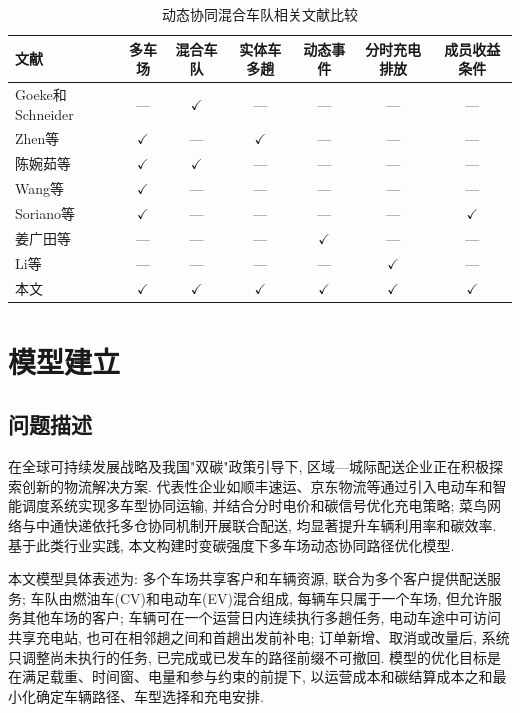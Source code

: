 \documentclass{setp-new}
\newcommand{\setptabsetup}{\fontsize{9pt}{10.5pt}\selectfont\renewcommand{\arraystretch}{0.90}\setlength{\tabcolsep}{2.2pt}\setlength{\aboverulesep}{0.4pt}\setlength{\belowrulesep}{0.4pt}\hbadness=10000}
\begin{document}
\begin{table}[H]
\centering
\caption{动态协同混合车队相关文献比较}
\label{tab:literature-comparison}
\setptabsetup
\begin{tabular*}{0.96\linewidth}{@{\extracolsep{\fill}}lcccccc@{}}
\toprule
文献 & 多车场 & 混合车队 & 实体车多趟 & 动态事件 & 分时充电排放 & 成员收益条件\\
\midrule
Goeke和Schneider\cite{ref:27} & --- & $\checkmark$ & --- & --- & --- & ---\\
Zhen等\cite{ref:44} & $\checkmark$ & --- & $\checkmark$ & --- & --- & ---\\
陈婉茹等\cite{ref:23} & $\checkmark$ & $\checkmark$ & --- & --- & --- & ---\\
Wang等\cite{ref:7} & $\checkmark$ & --- & --- & --- & --- & ---\\
Soriano等\cite{ref:8} & $\checkmark$ & --- & --- & --- & --- & $\checkmark$\\
姜广田等\cite{ref:51} & --- & --- & --- & $\checkmark$ & --- & ---\\
Li等\cite{ref:52} & --- & --- & --- & --- & $\checkmark$ & ---\\
本文 & $\checkmark$ & $\checkmark$ & $\checkmark$ & $\checkmark$ & $\checkmark$ & $\checkmark$\\
\bottomrule
\end{tabular*}
\end{table}


\section{模型建立}

\subsection{问题描述}

在全球可持续发展战略及我国"双碳"政策引导下,
区域—城际配送企业正在积极探索创新的物流解决方案.
代表性企业如顺丰速运、京东物流等通过引入电动车和智能调度系统实现多车型协同运输,
并结合分时电价和碳信号优化充电策略;
菜鸟网络与中通快递依托多仓协同机制开展联合配送, 均显著提升车辆利用率和碳效率.
基于此类行业实践, 本文构建时变碳强度下多车场动态协同路径优化模型.

本文模型具体表述为:
多个车场共享客户和车辆资源, 联合为多个客户提供配送服务;
车队由燃油车(CV)和电动车(EV)混合组成, 每辆车只属于一个车场, 但允许服务其他车场的客户;
车辆可在一个运营日内连续执行多趟任务,
电动车途中可访问共享充电站, 也可在相邻趟之间和首趟出发前补电;
订单新增、取消或改量后, 系统只调整尚未执行的任务, 已完成或已发车的路径前缀不可撤回.
模型的优化目标是在满足载重、时间窗、电量和参与约束的前提下,
以运营成本和碳结算成本之和最小化确定车辆路径、车型选择和充电安排.
\end{document}
